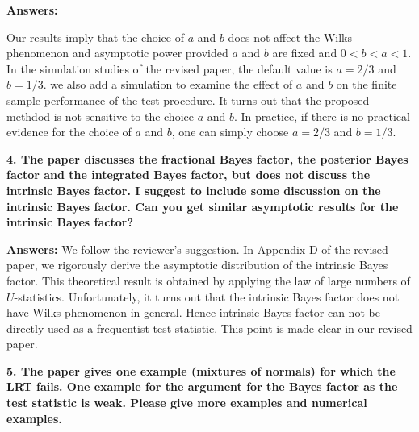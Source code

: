 \documentclass[11pt]{article}
\theoremstyle{plain}
\theoremstyle{definition}
\theoremstyle{remark}
\begin{document}
\textbf{Answers:}

Our results imply that the choice of $a$ and $b$ does not affect the Wilks phenomenon and asymptotic power provided $a$ and $b$ are fixed and $0<b<a<1$.
In the simulation studies of the revised paper, the default value is $a=2/3$ and $b= 1/3$.
we also add a simulation to examine the effect of $a$ and $b$ on the finite sample performance of the test procedure.
It turns out that the proposed methdod is not sensitive to the choice $a$ and $b$.
In practice, if there is no practical evidence for the choice of $a$ and $b$, one can simply choose $a = 2/3$ and $b = 1/3$.

\textbf{
    4. The paper discusses the fractional Bayes factor, the posterior Bayes factor and the integrated Bayes factor, but does not discuss the intrinsic Bayes factor. I suggest to include some discussion on the intrinsic Bayes factor. Can you get similar asymptotic results for the intrinsic Bayes factor?
}

\textbf{Answers:}
We follow the reviewer's suggestion.
In Appendix D of the revised paper, we rigorously derive the asymptotic distribution of the intrinsic Bayes factor.
This theoretical result is obtained by applying the law of large numbers of $U$-statistics. 
Unfortunately, it turns out that the intrinsic Bayes factor does not have Wilks phenomenon in general.
Hence intrinsic Bayes factor can not be directly used as a frequentist test statistic.
This point is made clear in our revised paper.

\textbf{
    5. The paper gives one example (mixtures of normals) for which the LRT fails. One example for the argument for the Bayes factor as the test statistic is weak. Please give more examples and numerical examples.
}
\end{document}
